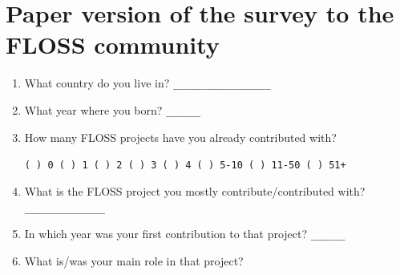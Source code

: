 \documentclass[lnbip]{svmultln}
\begin{document}
\appendix
\section{Paper version of the survey to the FLOSS community}
\label{appendix:a}

\begin{enumerate}
\item What country do you live in? \verb=_________________=
  \vspace{8pt}

\item What year where you born? \verb=______= \vspace{8pt}

\item How many FLOSS projects have you already contributed with?

  \verb=( ) 0 ( ) 1 ( ) 2 ( ) 3 ( ) 4 ( ) 5-10 ( ) 11-50 ( ) 51+=
  \vspace{8pt}

\item What is the FLOSS project you mostly contribute/contributed with? \verb= ______________= \vspace{0pt}

\item In which year was your first contribution to that project?
  \verb=______= \vspace{8pt}

\item What is/was your main role in that project?
  \vspace{8pt}


\end{enumerate}
\end{document}
